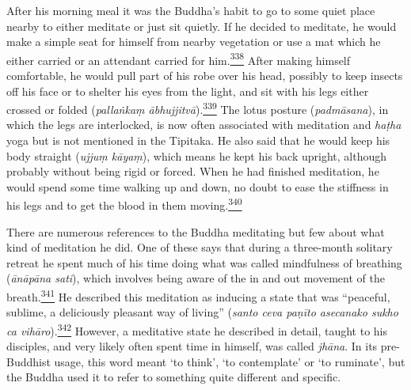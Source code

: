 After his morning meal it was the Buddha's habit to go to some quiet
place nearby to either meditate or just sit quietly. If he decided to
meditate, he would make a simple seat for himself from nearby vegetation
or use a mat which he either carried or an attendant carried for
him.\label{footprints_split_011.html_fnref338}\hyperref[footprints_split_024.htmlux5cux23fn338]{\textsuperscript{338}}
After making himself comfortable, he would pull part of his robe over
his head, possibly to keep insects off his face or to shelter his eyes
from the light, and sit with his legs either crossed or folded
(\emph{pallaṅkaṃ
ābhujjitvā}).\label{footprints_split_011.html_fnref339}\hyperref[footprints_split_024.htmlux5cux23fn339]{\textsuperscript{339}}
The lotus posture (\emph{padmāsana}), in which the legs are interlocked,
is now often associated with meditation and \emph{haṭha} yoga but is not
mentioned in the Tipitaka. He also said that he would keep his body
straight (\emph{ujjuṃ kāyaṃ}), which means he kept his back upright,
although probably without being rigid or forced. When he had finished
meditation, he would spend some time walking up and down, no doubt to
ease the stiffness in his legs and to get the blood in them
moving.\label{footprints_split_011.html_fnref340}\hyperref[footprints_split_024.htmlux5cux23fn340]{\textsuperscript{340}}

There are numerous references to the Buddha meditating but few about
what kind of meditation he did. One of these says that during a
three-month solitary retreat he spent much of his time doing what was
called mindfulness of breathing (\emph{ānāpāna sati}), which involves
being aware of the in and out movement of the
breath.\label{footprints_split_011.html_fnref341}\hyperref[footprints_split_024.htmlux5cux23fn341]{\textsuperscript{341}}
He described this meditation as inducing a state that was ``peaceful,
sublime, a deliciously pleasant way of living'' (\emph{santo ceva paṇīto
asecanako sukho ca
vihāro}).\label{footprints_split_011.html_fnref342}\hyperref[footprints_split_024.htmlux5cux23fn342]{\textsuperscript{342}}
However, a meditative state he described in detail, taught to his
disciples, and very likely often spent time in himself, was called
\emph{jhāna}. In its pre-Buddhist usage, this word meant `to think', `to
contemplate' or `to ruminate', but the Buddha used it to refer to
something quite different and specific.

